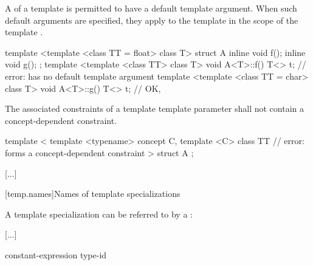 \documentclass{wg21}
\begin{document}

\pnum
A  of
a template 
is permitted to have a default template argument.
When such default arguments are specified,
they apply to the template 
in the scope of the template .
\begin{example}
\begin{codeblock}
    template <template <class TT = float> class T> struct A {
        inline void f();
        inline void g();
    };
    template <template <class TT> class T> void A<T>::f() {
        T<> t;            // error:  has no default template argument
    }
    template <template <class TT = char> class T> void A<T>::g() {
        T<> t;            // OK, 
    }
\end{codeblock}
\end{example}

\begin{addedblock}
The associated constraints of a template template parameter shall not contain a concept-dependent constraint.
\begin{example}
\begin{codeblock}

template <
    template <typename> concept C,
    template <C> class TT // error:  forms a concept-dependent constraint
>
struct A {};
\end{codeblock}
\end{example}
\end{addedblock}

\textcolor{noteclr}{[...]}

[temp.names]{Names of template specializations}

\pnum
A template specialization  can be referred to by a
:

\begin{bnf}
    \textcolor{noteclr}{[...]}
\end{bnf}

\begin{bnf}
    \br
    constant-expression\br
    type-id\br
    \br
\end{bnf}


\end{document}
